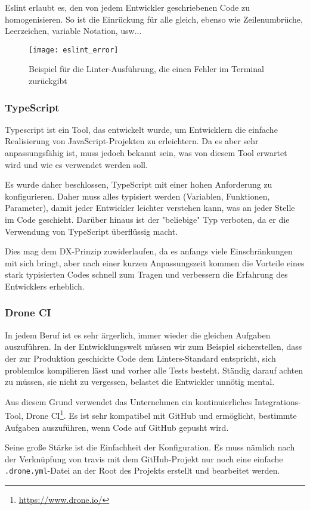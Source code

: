 Eslint erlaubt es, den von jedem Entwickler geschriebenen Code zu homogenisieren.
So ist die Einrückung für alle gleich, ebenso wie Zeilenumbrüche, Leerzeichen, variable Notation, usw...

\begin{figure}[h]
  \centering
  \texttt{[image: eslint\_error]}
  \caption{Beispiel für die Linter-Ausführung, die einen Fehler im Terminal zurückgibt}
\end{figure}

\subsubsection{TypeScript}

Typescript ist ein Tool, das entwickelt wurde, um Entwicklern die einfache Realisierung von JavaScript-Projekten zu erleichtern.
Da es aber sehr anpassungsfähig ist, muss jedoch bekannt sein, was von diesem Tool erwartet wird und wie es verwendet werden soll.

Es wurde daher beschlossen, TypeScript mit einer hohen Anforderung zu konfigurieren.
Daher muss alles typisiert werden (Variablen, Funktionen, Parameter), damit jeder Entwickler leichter verstehen kann, was an jeder Stelle im Code geschieht.
Darüber hinaus ist der "beliebige" Typ verboten, da er die Verwendung von TypeScript überflüssig macht.

Dies mag dem DX-Prinzip zuwiderlaufen, da es anfangs viele Einschränkungen mit sich bringt, aber nach einer kurzen Anpassungszeit kommen die Vorteile eines stark typisierten Codes schnell zum Tragen und verbessern die Erfahrung des Entwicklers erheblich.

\subsubsection{Drone CI}

In jedem Beruf ist es sehr ärgerlich, immer wieder die gleichen Aufgaben auszuführen.
In der Entwicklungswelt müssen wir zum Beispiel sicherstellen, dass der zur Produktion geschickte Code dem Linters-Standard entspricht, sich problemlos kompilieren lässt und vorher alle Tests besteht.
Ständig darauf achten zu müssen, sie nicht zu vergessen, belastet die Entwickler unnötig mental.

Aus diesem Grund verwendet das Unternehmen ein kontinuierliches Integrations-Tool, Drone CI\footnote{\href{https://www.drone.io/}{https://www.drone.io/}}.
Es ist sehr kompatibel mit GitHub und ermöglicht, bestimmte Aufgaben auszuführen, wenn Code auf GitHub gepusht wird.

Seine große Stärke ist die Einfachheit der Konfiguration. Es muss nämlich nach der Verknüpfung von travis mit dem GitHub-Projekt nur noch eine einfache \lstinline!.drone.yml!-Datei an der Root des Projekts erstellt und bearbeitet werden.

